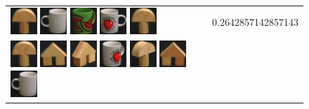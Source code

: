 \begin{figure}[tbp]
\begin{center}
\begin{tabular}{m{11cm} | m{3cm} |}
\includegraphics[width=1cm]{coil/beeld-1.eps}
\includegraphics[width=1cm]{coil/beeld-37.eps}
\includegraphics[width=1cm]{coil/beeld-33.eps}
\includegraphics[width=1cm]{coil/beeld-36.eps}
\includegraphics[width=1cm]{coil/beeld-0.eps}
& {\scriptsize 0.2642857142857143}
\\
\includegraphics[width=1cm]{coil/beeld-0.eps}
\includegraphics[width=1cm]{coil/beeld-42.eps}
\includegraphics[width=1cm]{coil/beeld-45.eps}
\includegraphics[width=1cm]{coil/beeld-39.eps}
\includegraphics[width=1cm]{coil/beeld-3.eps}
\includegraphics[width=1cm]{coil/beeld-43.eps}
\includegraphics[width=1cm]{coil/beeld-37.eps}

\end{tabular}
\end{center}
\end{figure}

